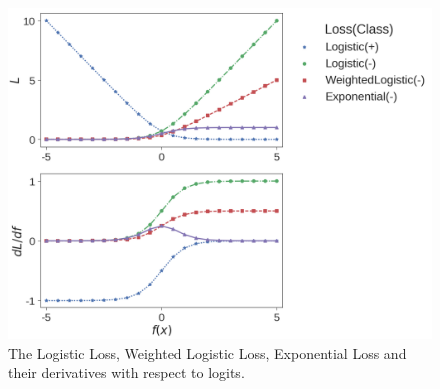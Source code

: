 \begin{figure}[t]
\centering
   \includegraphics[width=1.05\linewidth]{img/losses}
\caption{The Logistic Loss, Weighted Logistic Loss, Exponential Loss and their derivatives with respect to logits.}
\label{fig:losses}
\end{figure}

